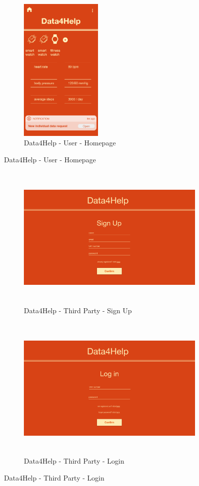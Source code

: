\begin{figure}[H]
\begin{subfigure}{.33\textwidth}
  \centering
  \includegraphics[width = .9\linewidth, height = 7cm, keepaspectratio]{./Images/Mockups/Data4Help/D4HU/D4HU_Homepage.png}
  \caption{Data4Help - User - Homepage}
\end{subfigure}
\end{figure}


\begin{figure}[H]
\centering
\begin{subfigure}{.5\textwidth}
  \centering
  \includegraphics[width=.9\linewidth, height = 7cm, keepaspectratio]{./Images/Mockups/Data4Help/D4HTP/D4HTP_SignUp.png}
  \caption{Data4Help - Third Party - Sign Up}
\end{subfigure}%
\begin{subfigure}{.5\textwidth}
  \centering
  \includegraphics[width = .9\linewidth, height = 7cm, keepaspectratio]{./Images/Mockups/Data4Help/D4HTP/D4HTP_Login.png}
  \caption{Data4Help - Third Party - Login}
\end{subfigure}
\end{figure}

